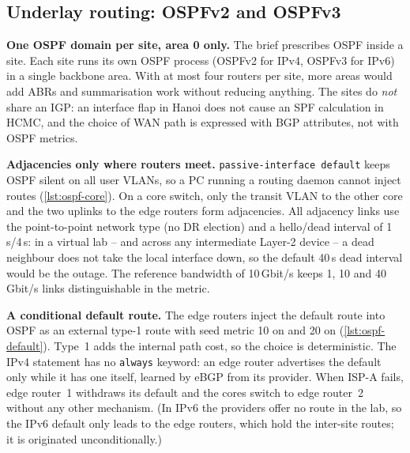 
\subsection{Underlay routing: OSPFv2 and OSPFv3}\label{sec:underlay}
\textbf{One OSPF domain per site, area 0 only.} The brief prescribes OSPF inside a site. Each site runs its
own OSPF process (OSPFv2 \cite{rfc2328} for IPv4, OSPFv3 \cite{rfc5340} for IPv6) in a single backbone area.
With at most four routers per site, more areas would add ABRs and summarisation work without reducing
anything. The sites do \emph{not} share an IGP: an interface flap in Hanoi does not cause an SPF calculation
in HCMC, and the choice of WAN path is expressed with BGP attributes, not with OSPF metrics.

\textbf{Adjacencies only where routers meet.} \texttt{passive-interface default} keeps OSPF silent on all
user VLANs, so a PC running a routing daemon cannot inject routes (\cref{lst:ospf-core}). On a core switch,
only the transit VLAN to the other core and the two uplinks to the edge routers form adjacencies. All
adjacency links use the point-to-point network type (no DR election) and a hello/dead interval of 1\,s/4\,s:
in a virtual lab -- and across any intermediate Layer-2 device -- a dead neighbour does not take the local
interface down, so the default 40\,s dead interval would be the outage. The reference bandwidth of
10\,Gbit/s keeps 1, 10 and 40\,Gbit/s links distinguishable in the metric.


\textbf{A conditional default route.} The edge routers inject the default route into OSPF as an external
type-1 route with seed metric 10 on  and 20 on 
(\cref{lst:ospf-default}). Type~1 adds the internal path cost, so the choice is deterministic. The IPv4
statement has no \texttt{always} keyword: an edge router advertises the default only while it has one itself,
learned by eBGP from its provider. When ISP-A fails, edge router~1 withdraws its default and the cores
switch to edge router~2 without any other mechanism. (In IPv6 the providers offer no route in the lab, so
the IPv6 default only leads to the edge routers, which hold the inter-site routes; it is originated
unconditionally.)


